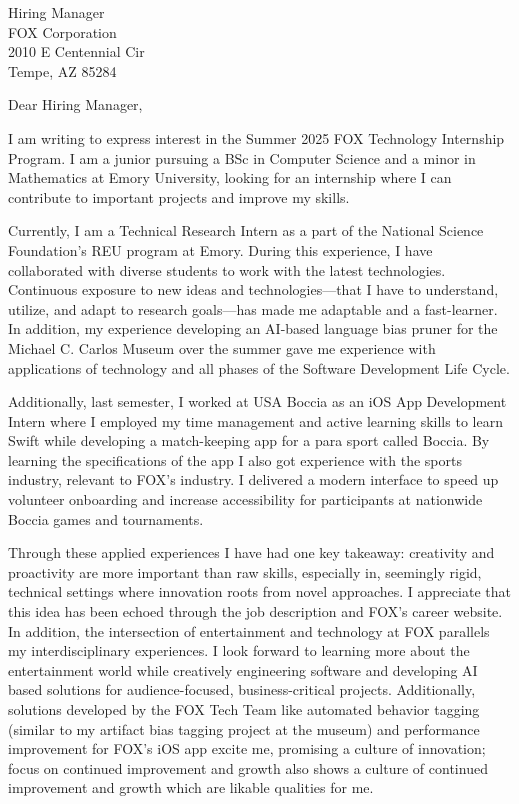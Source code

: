 \documentclass[letterpaper,12pt]{letter}
\date{}
\begin{document}
\begin{letter}{%
    Hiring Manager \\ 
	FOX Corporation \\
	2010 E Centennial Cir \\
	Tempe, AZ 85284
}

\opening{Dear Hiring Manager,}

I am writing to express interest in the Summer 2025 FOX Technology Internship Program. I am a junior pursuing 
a BSc in Computer Science and a minor in Mathematics at Emory University, looking for an internship where I can 
contribute to important projects and improve my skills.

Currently, I am a Technical Research Intern as a part of the National Science Foundation's 
REU program at Emory. During this experience, I have  
collaborated with diverse students to work with the latest 
technologies.
Continuous exposure to new ideas and technologies—that I have to understand, 
utilize, and adapt to research goals—has made me adaptable and a fast-learner. 
In addition, my experience developing an AI-based language bias pruner for the
Michael C. Carlos Museum over the summer gave me experience with 
applications of technology and all phases of the Software Development Life Cycle.


Additionally, last semester, I worked at USA Boccia as an iOS App Development Intern 
where I employed my time management and active learning 
skills to learn Swift while developing a match-keeping app for a para sport 
called Boccia. By learning the specifications of the app I also got experience with
the sports industry, relevant to FOX's industry.
I delivered a modern interface to speed up volunteer onboarding and increase
accessibility for participants at nationwide Boccia games and tournaments.

Through these applied experiences I have had one key takeaway: creativity and proactivity 
are more important than raw skills, especially in, seemingly rigid, technical
settings where innovation roots from novel approaches. I appreciate that this idea has 
been echoed through the job 
description and FOX's career website. In addition, the intersection 
of entertainment and technology at FOX parallels my interdisciplinary experiences.
I look forward to learning more about the entertainment world while creatively engineering
software and developing AI based solutions
for audience-focused, business-critical projects. Additionally, solutions developed by the FOX Tech Team
like automated behavior tagging (similar to my artifact bias tagging project at the museum) 
and performance improvement for FOX's iOS app excite me, 
promising a culture of innovation; focus on continued improvement and growth also 
shows a culture of continued improvement and growth which are likable qualities for me. 


\end{letter}
\end{document}
